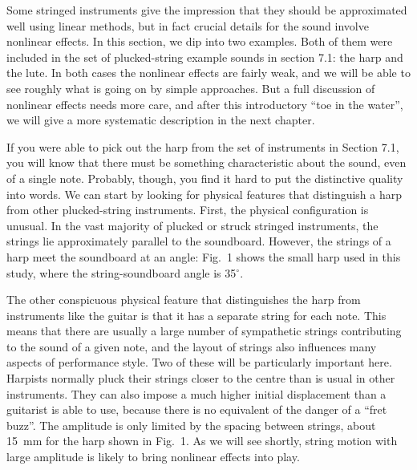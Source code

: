 

  Some stringed instruments give the impression that they should be 
  approximated well using linear methods, but in fact crucial details for the 
  sound involve nonlinear effects. In this section, we dip into two examples. 
  Both of them were included in the set of plucked-string example sounds in 
  section 7.1: the harp and the lute. In both cases the nonlinear effects are 
  fairly weak, and we will be able to see roughly what is going on by simple 
  approaches. But a full discussion of nonlinear effects needs more care, and 
  after this introductory “toe in the water”, we will give a more systematic 
  description in the next chapter. 

  If you were able to pick out the harp from the set of instruments in Section 
  7.1, you will know that there must be something characteristic about the 
  sound, even of a single note. Probably, though, you find it hard to put the 
  distinctive quality into words. We can start by looking for physical features 
  that distinguish a harp from other plucked-string instruments. First, the 
  physical configuration is unusual. In the vast majority of plucked or struck 
  stringed instruments, the strings lie approximately parallel to the 
  soundboard. However, the strings of a harp meet the soundboard at an angle: 
  Fig.\ 1 shows the small harp used in this study, where the string-soundboard 
  angle is 35$^\circ$. 

  The other conspicuous physical feature that distinguishes the harp from 
  instruments like the guitar is that it has a separate string for each note. 
  This means that there are usually a large number of sympathetic strings 
  contributing to the sound of a given note, and the layout of strings also 
  influences many aspects of performance style. Two of these will be 
  particularly important here. Harpists normally pluck their strings closer to 
  the centre than is usual in other instruments. They can also impose a much 
  higher initial displacement than a guitarist is able to use, because there is 
  no equivalent of the danger of a “fret buzz”. The amplitude is only limited 
  by the spacing between strings, about 15~mm for the harp shown in Fig.\ 1. As 
  we will see shortly, string motion with large amplitude is likely to bring 
  nonlinear effects into play. 

